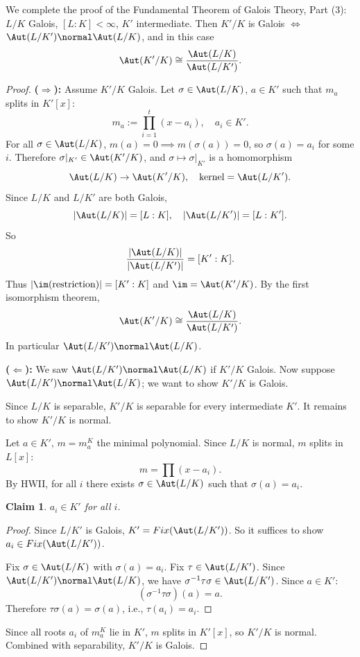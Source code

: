 \documentclass[a4paper,12pt]{article}
\newtheorem{claim}[thm]{Claim}
\begin{document}
We complete the proof of the Fundamental Theorem of Galois Theory, Part (3): $L/K$ Galois, $[L:K]<\infty$, $K'$ intermediate. Then $K'/K$ is Galois $\iff$ $\Aut(L/K')\normal \Aut(L/K)$, and in this case 
\[
\Aut(K'/K)\cong \frac{\Aut(L/K)}{\Aut(L/K')}
.\]
\begin{proof}
    \textbf{($\Rightarrow$):} Assume $K'/K$ Galois. Let $\sigma\in\Aut(L/K)$, $a\in K'$ such that $m_a$ splits in $K'[x]$:
    \[
    m_a := \prod_{i=1}^t(x-a_i),\quad a_i\in K'
    .\]
    For all $\sigma\in\Aut(L/K)$, $m(a)=0\implies m(\sigma(a))=0$, so $\sigma(a)=a_i$ for some $i$. Therefore $\sigma|_{K'}\in\Aut(K'/K)$, and $\sigma\mapsto\sigma|_{K'}$ is a homomorphism
    \[
    \Aut(L/K)\to\Aut(K'/K),\quad \text{kernel}=\Aut(L/K')
    .\]
    Since $L/K$ and $L/K'$ are both Galois,
    \[
    |\Aut(L/K)|=[L:K],\quad |\Aut(L/K')|=[L:K']
    .\]
    So 
    \[
    \frac{|\Aut(L/K)|}{|\Aut(L/K')|}=[K':K]
    .\]
    Thus $|\im(\text{restriction})|=[K':K]$ and $\im=\Aut(K'/K)$. By the first isomorphism theorem,
    \[
    \Aut(K'/K)\cong \frac{\Aut(L/K)}{\Aut(L/K')}
    .\]
    In particular $\Aut(L/K')\normal \Aut(L/K)$.

    \textbf{($\Leftarrow$):} We saw $\Aut(L/K')\normal\Aut(L/K)$ if $K'/K$ Galois. Now suppose $\Aut(L/K')\normal\Aut(L/K)$; we want to show $K'/K$ is Galois.

    Since $L/K$ is separable, $K'/K$ is separable for every intermediate $K'$. It remains to show $K'/K$ is normal.

    Let $a\in K'$, $m=m_a^K$ the minimal polynomial. Since $L/K$ is normal, $m$ splits in $L[x]$:
    \[
    m=\prod(x-a_i)
    .\]
    By HWII, for all $i$ there exists $\sigma\in\Aut(L/K)$ such that $\sigma(a)=a_i$.
    \begin{claim}
        $a_i\in K'$ for all $i$.
    \end{claim}
    \begin{proof}
        Since $L/K'$ is Galois, $K'=Fix(\Aut(L/K'))$. So it suffices to show $a_i\in Fix(\Aut(L/K'))$.

        Fix $\sigma\in\Aut(L/K)$ with $\sigma(a)=a_i$. Fix $\tau\in\Aut(L/K')$. Since $\Aut(L/K')\normal\Aut(L/K)$, we have $\sigma^{-1}\tau\sigma\in\Aut(L/K')$. Since $a\in K'$:
        \[
        (\sigma^{-1}\tau\sigma)(a)=a
        .\]
        Therefore $\tau\sigma(a)=\sigma(a)$, i.e., $\tau(a_i)=a_i$.
    \end{proof}
    Since all roots $a_i$ of $m_a^K$ lie in $K'$, $m$ splits in $K'[x]$, so $K'/K$ is normal. Combined with separability, $K'/K$ is Galois.
\end{proof}
\end{document}
